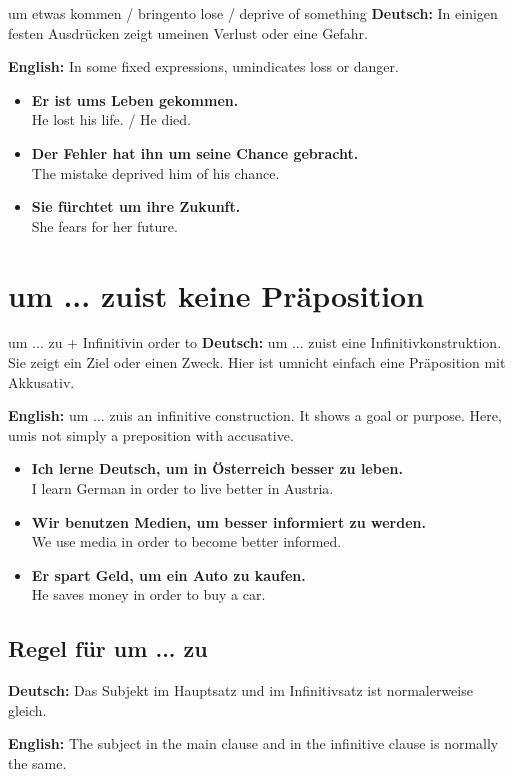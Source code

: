 \documentclass[a4paper,11pt]{article}
\newcommand{\GermanText}[1]{\textbf{Deutsch: }#1\par}
\newcommand{\EnglishText}[1]{{\small\color{SoftGray}\textbf{English: }#1\par}}
\newcommand{\ExampleItem}[2]{\item \textbf{#1}\\{\small\color{SoftGray}#2}}
\begin{document}
\begin{grammarentry}{um etwas kommen / bringen}{to lose / deprive of something}
\GermanText{In einigen festen Ausdrücken zeigt \glqq um\grqq einen Verlust oder eine Gefahr.}
\EnglishText{In some fixed expressions, \glqq um\grqq indicates loss or danger.}
\end{grammarentry}

\begin{exbox}
\begin{itemize}
    \ExampleItem{Er ist ums Leben gekommen.}{He lost his life. / He died.}
    \ExampleItem{Der Fehler hat ihn um seine Chance gebracht.}{The mistake deprived him of his chance.}
    \ExampleItem{Sie fürchtet um ihre Zukunft.}{She fears for her future.}
\end{itemize}
\end{exbox}

\section{\glqq um ... zu\grqq ist keine Präposition}

\begin{grammarentry}{um ... zu + Infinitiv}{in order to}
\GermanText{\glqq um ... zu\grqq ist eine Infinitivkonstruktion. Sie zeigt ein Ziel oder einen Zweck. Hier ist \glqq um\grqq nicht einfach eine Präposition mit Akkusativ.}
\EnglishText{\glqq um ... zu\grqq is an infinitive construction. It shows a goal or purpose. Here, \glqq um\grqq is not simply a preposition with accusative.}
\end{grammarentry}

\begin{exbox}
\begin{itemize}
    \ExampleItem{Ich lerne Deutsch, um in Österreich besser zu leben.}{I learn German in order to live better in Austria.}
    \ExampleItem{Wir benutzen Medien, um besser informiert zu werden.}{We use media in order to become better informed.}
    \ExampleItem{Er spart Geld, um ein Auto zu kaufen.}{He saves money in order to buy a car.}
\end{itemize}
\end{exbox}

\subsection{Regel für \glqq um ... zu\grqq}

\GermanText{Das Subjekt im Hauptsatz und im Infinitivsatz ist normalerweise gleich.}
\EnglishText{The subject in the main clause and in the infinitive clause is normally the same.}
\end{document}
